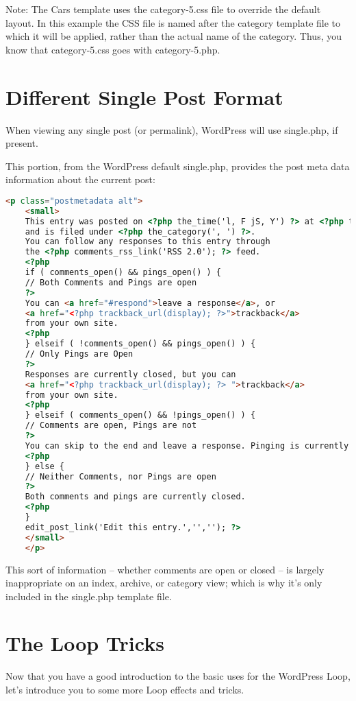 Note: The Cars template uses the category-5.css file to override the default layout. In this example the CSS file is named after the category template file to which it will be applied, rather than the actual name of the category. Thus, you know that category-5.css goes with category-5.php.

\section{Different Single Post Format}

When viewing any single post (or permalink), WordPress will use single.php, if present.

This portion, from the WordPress default single.php, provides the post meta data information about the current post:

\begin{lstlisting}[language=HTML]
	<p class="postmetadata alt">
	<small>
	This entry was posted on <?php the_time('l, F jS, Y') ?> at <?php the_time() ?> 
	and is filed under <?php the_category(', ') ?>.
	You can follow any responses to this entry through 
	the <?php comments_rss_link('RSS 2.0'); ?> feed.
	<?php
	if ( comments_open() && pings_open() ) {
	// Both Comments and Pings are open
	?>
	You can <a href="#respond">leave a response</a>, or 
	<a href="<?php trackback_url(display); ?>">trackback</a> 
	from your own site.
	<?php 
	} elseif ( !comments_open() && pings_open() ) {
	// Only Pings are Open 
	?>
	Responses are currently closed, but you can 
	<a href="<?php trackback_url(display); ?> ">trackback</a> 
	from your own site.
	<?php
	} elseif ( comments_open() && !pings_open() ) { 
	// Comments are open, Pings are not 
	?>
	You can skip to the end and leave a response. Pinging is currently not allowed.
	<?php
	} else { 
	// Neither Comments, nor Pings are open 
	?>
	Both comments and pings are currently closed.
	<?php 
	} 
	edit_post_link('Edit this entry.','',''); ?>
	</small>
	</p>
\end{lstlisting}

This sort of information -- whether comments are open or closed -- is largely inappropriate on an index, archive, or category view; which is why it's only included in the single.php template file.

\section{The Loop Tricks}

Now that you have a good introduction to the basic uses for the WordPress Loop, let's introduce you to some more Loop effects and tricks.

